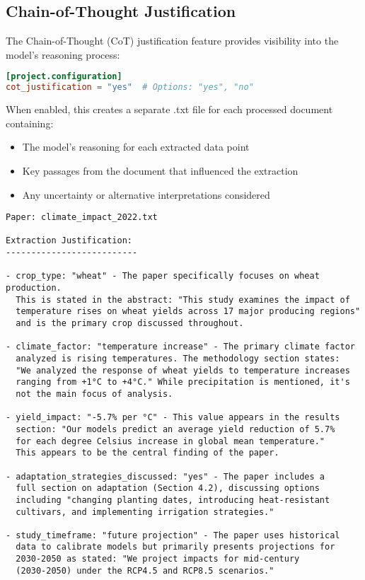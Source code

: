 \subsection{Chain-of-Thought Justification}

The Chain-of-Thought (CoT) justification feature provides visibility into the model's reasoning process:

\begin{configbox}
\begin{lstlisting}[language=TOML]
[project.configuration]
cot_justification = "yes"  # Options: "yes", "no"
\end{lstlisting}
\end{configbox}

When enabled, this creates a separate .txt file for each processed document containing:
\begin{itemize}
    \item The model's reasoning for each extracted data point
    \item Key passages from the document that influenced the extraction
    \item Any uncertainty or alternative interpretations considered
\end{itemize}

\begin{commandbox}
\begin{lstlisting}
Paper: climate_impact_2022.txt

Extraction Justification:
--------------------------

- crop_type: "wheat" - The paper specifically focuses on wheat production.
  This is stated in the abstract: "This study examines the impact of
  temperature rises on wheat yields across 17 major producing regions"
  and is the primary crop discussed throughout.

- climate_factor: "temperature increase" - The primary climate factor
  analyzed is rising temperatures. The methodology section states:
  "We analyzed the response of wheat yields to temperature increases
  ranging from +1°C to +4°C." While precipitation is mentioned, it's
  not the main focus of analysis.

- yield_impact: "-5.7% per °C" - This value appears in the results
  section: "Our models predict an average yield reduction of 5.7%
  for each degree Celsius increase in global mean temperature."
  This appears to be the central finding of the paper.

- adaptation_strategies_discussed: "yes" - The paper includes a
  full section on adaptation (Section 4.2), discussing options
  including "changing planting dates, introducing heat-resistant
  cultivars, and implementing irrigation strategies."

- study_timeframe: "future projection" - The paper uses historical
  data to calibrate models but primarily presents projections for
  2030-2050 as stated: "We project impacts for mid-century
  (2030-2050) under the RCP4.5 and RCP8.5 scenarios."
\end{lstlisting}
\end{commandbox}

